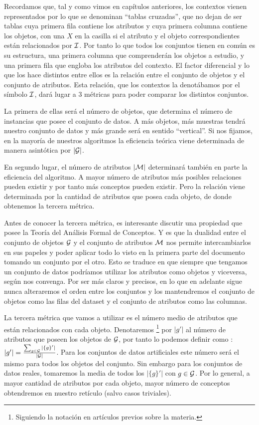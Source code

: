 \documentclass[oneside,openright,titlepage,numbers=noenddot,openany,headinclude,footinclude=true,
cleardoublepage=empty,abstractoff,BCOR=5mm,paper=a4,fontsize=12pt,main=spanish]{scrreprt}
\begin{document}
Recordamos que, tal y como vimos en capítulos anteriores, los contextos vienen representados por lo que se denominan ``tablas cruzadas'', que no dejan de ser tablas cuya primera fila contiene los atributos y cuya primera columna contiene los objetos, con una $X$ en la casilla si el atributo y el objeto correspondientes están relacionados por $\mathcal{I}$. Por tanto lo que todos los conjuntos tienen en común es su estructura, una primera columna que comprenderán los objetos a estudio, y una primera fila que engloba los atributos del contexto. El factor diferencial y lo que los hace distintos entre ellos es la relación entre el conjunto de objetos y el conjunto de atributos. Esta relación, que los contextos la denotábamos por el símbolo $\mathcal{I}$, dará lugar a 3 métricas para poder comparar los distintos conjuntos.

La primera de ellas será el número de objetos, que determina el número de instancias que posee el conjunto de datos. A más objetos, más muestras tendrá nuestro conjunto de datos y más grande será en sentido ``vertical''. Si nos fijamos, en la mayoría de nuestros algoritmos la eficiencia teórica viene determinada de manera asintótica por $|\mathcal{G}|$.

En segundo lugar, el número de atributos $|\mathcal{M}|$ determinará también en parte la eficiencia del algoritmo. A mayor número de atributos más posibles relaciones pueden existir y por tanto más conceptos pueden existir. Pero la relación viene determinada por la cantidad de atributos que posea cada objeto, de donde obtenemos la tercera métrica.

Antes de conocer la tercera métrica, es interesante discutir una propiedad que posee la Teoría del Análisis Formal de Conceptos. Y es que la dualidad entre el conjunto de objetos $\mathcal{G}$ y el conjunto de atributos $\mathcal{M}$ nos permite intercambiarlos en sus papeles y poder aplicar todo lo visto en la primera parte del documento tomando un conjunto por el otro. Esto se traduce en que siempre que tengamos un conjunto de datos podríamos utilizar los atributos como objetos y viceversa, según nos convenga. Por ser más claros y precisos, en lo que en adelante sigue nunca alteraremos el orden entre los conjuntos y los mantendremos el conjunto de objetos como las filas del dataset y el conjunto de atributos como las columnas.

La tercera métrica que vamos a utilizar es el número medio de atributos que están relacionados con cada objeto. Denotaremos \footnote{Siguiendo la notación en artículos previos sobre la materia.} por $|g'|$  al número de atributos que poseen los objetos de $\mathcal{G}$, por tanto lo podemos definir como : $|g'|=\frac{\sum_{g \in \mathcal{G}}|\{g\}' |}{|\mathcal{G}|}$. Para los conjuntos de datos artificiales este número será el mismo para todos los objetos del conjunto. Sin embargo para los conjuntos de datos reales, tomaremos la media de todos los $|\{g\}'|$ con $g\in \mathcal{G}$. Por lo general, a mayor cantidad de atributos por cada objeto, mayor número de conceptos obtendremos en nuestro retículo (salvo casos triviales).
\end{document}
